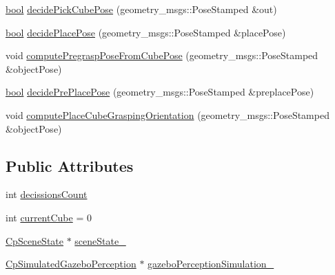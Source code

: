 \begin{DoxyCompactItemize}
\item 
\hyperlink{classbool}{bool} \hyperlink{classsm__fetch__six__table__pick__n__sort__1_1_1cl__perception__system_1_1ClPerceptionSystem_ada6bee3141c1a45d1b7a0a74b2d13a7a}{decide\+Pick\+Cube\+Pose} (geometry\+\_\+msgs\+::\+Pose\+Stamped \&out)
\item 
\hyperlink{classbool}{bool} \hyperlink{classsm__fetch__six__table__pick__n__sort__1_1_1cl__perception__system_1_1ClPerceptionSystem_a553101516ba25a6a9f293e33b4e90dad}{decide\+Place\+Pose} (geometry\+\_\+msgs\+::\+Pose\+Stamped \&place\+Pose)
\item 
void \hyperlink{classsm__fetch__six__table__pick__n__sort__1_1_1cl__perception__system_1_1ClPerceptionSystem_ab90e02cac4445dc58490f6edb80f4b6d}{compute\+Pregrasp\+Pose\+From\+Cube\+Pose} (geometry\+\_\+msgs\+::\+Pose\+Stamped \&object\+Pose)
\item 
\hyperlink{classbool}{bool} \hyperlink{classsm__fetch__six__table__pick__n__sort__1_1_1cl__perception__system_1_1ClPerceptionSystem_ae69404508a52c60784861163701c5fee}{decide\+Pre\+Place\+Pose} (geometry\+\_\+msgs\+::\+Pose\+Stamped \&preplace\+Pose)
\item 
void \hyperlink{classsm__fetch__six__table__pick__n__sort__1_1_1cl__perception__system_1_1ClPerceptionSystem_a1689e36f9cb669ec8ec28d69f44f989d}{compute\+Place\+Cube\+Grasping\+Orientation} (geometry\+\_\+msgs\+::\+Pose\+Stamped \&object\+Pose)
\end{DoxyCompactItemize}
\subsection*{Public Attributes}
\begin{DoxyCompactItemize}
\item 
int \hyperlink{classsm__fetch__six__table__pick__n__sort__1_1_1cl__perception__system_1_1ClPerceptionSystem_a1028396bb0aef5d610f8c09a23a8e3cc}{decissions\+Count}
\item 
int \hyperlink{classsm__fetch__six__table__pick__n__sort__1_1_1cl__perception__system_1_1ClPerceptionSystem_abdaef89ff802e4e855073c1f2469f03c}{current\+Cube} = 0
\item 
\hyperlink{classsm__fetch__six__table__pick__n__sort__1_1_1cl__perception__system_1_1CpSceneState}{Cp\+Scene\+State} $\ast$ \hyperlink{classsm__fetch__six__table__pick__n__sort__1_1_1cl__perception__system_1_1ClPerceptionSystem_abf68c35d49ab0c766521e23f4e3b4d41}{scene\+State\+\_\+}
\item 
\hyperlink{classsm__fetch__six__table__pick__n__sort__1_1_1cl__perception__system_1_1CpSimulatedGazeboPerception}{Cp\+Simulated\+Gazebo\+Perception} $\ast$ \hyperlink{classsm__fetch__six__table__pick__n__sort__1_1_1cl__perception__system_1_1ClPerceptionSystem_a35f95a434ce0c5c8f1a0d3b35cc69035}{gazebo\+Perception\+Simulation\+\_\+}
\end{DoxyCompactItemize}
